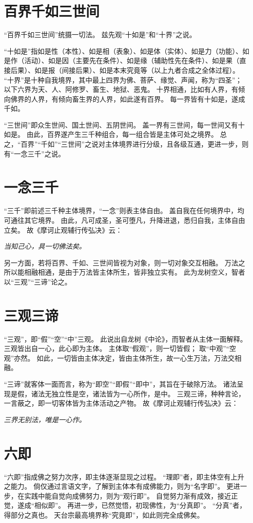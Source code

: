 \documentclass[11pt]{article}
\begin{document}
\section{百界千如三世间}
“百界千如三世间”统摄一切法。
兹先观“十如是”和“十界”之说。

\newline

“十如是”指如是性（本性）、如是相（表象）、如是体（实体）、如是力（功能）、如是作（活动）、如是因（主要先在条件）、如是缘（辅助性先在条件）、如是果（直接后果）、如是报（间接后果）、如是本末究竟等（以上九者合成之全体过程）。
“十界”是十种自我境界，其中最上四界为佛、菩萨、缘觉、声闻，称为“四圣”；
以下六界为天、人、阿修罗、畜生、地狱、恶鬼。
十界相通，比如有人界，有倾向佛界的人界，有倾向畜生界的人界，如此遂有百界。
每一界皆有十如是，遂成千如。

\newline

“三世间”即众生世间、国土世间、五阴世间。
盖一界有三世间，每一世间又有十如是。
由此，百界遂产生三千种组合，每一组合皆是主体可处之境界。
总之，“百界”“千如”“三世间”之说对主体境界进行分级，且各级互通，更进一步，则有“一念三千”之说。

\section{一念三千}
“三千”即前述三千种主体境界，“一念”则表主体自由。
盖自我在任何境界中，均可通往其它境界。
由此，凡可成圣，圣可堕凡，升降进退，悉归自我，主体自由立矣。
故《摩诃止观辅行传弘决》云：

\textit{当知己心，具一切佛法矣。}

另一方面，若将百界、千如、三世间皆视为对象，则一切对象交互相融。
万法之所以能相融相通，是由于万法皆主体所生，皆非独立实有。
此为龙树空义，智者以“三观”“三谛”论之。

\section{三观三谛}
“三观”，即“假”“空”“中”三观。
此说出自龙树《中论》，而智者从主体一面解释。
三观皆出自一心，此心即为主体。
主体取“假观”，则一切皆假；
取“中观”“空观”亦然。
如此，一切皆由主体决定，皆由主体所生，故一心生万法，万法交相融。

\newline

“三谛”就客体一面而言，称为“即空”“即假”“即中”，其旨在于破除万法。
诸法呈现是假，诸法无独立性是空，诸法皆为一心所作，是中。
三观三谛，种种言论，一言蔽之，即一切客体皆为主体活动之产物。
故《摩诃止观辅行传弘决》云：

\textit{三界无别法，唯是一心作。}

\section{六即}
“六即”指成佛之努力次序，即主体逐渐显现之过程。
“理即”者，即主体空有上升之能力。
倘仅通过言语文字，了解到主体本有成佛能力，则为“名字即”。
更进一步，在实践中能自觉向成佛努力，则为“观行即”。
自觉努力渐有成效，接近正觉，遂成“相似即”。
再进一步，已然觉悟，初现佛性，为“分真即”。
“分真”者，得部分之真也。
天台宗最高境界称“究竟即”，如此则完全成佛矣。
  
\end{document}
